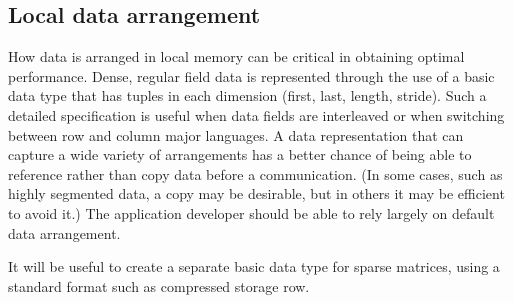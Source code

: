 \subsection{Local data arrangement}
How data is arranged in local memory can be critical in obtaining optimal 
performance.  Dense, regular field data is represented through the use 
of a basic data type that has tuples in each dimension (first, last, 
length, stride).  Such a detailed specification is useful when data fields are 
interleaved or when switching 
between row and column major languages.  A data representation that can 
capture a wide variety of arrangements has a better chance of being 
able to reference rather than copy data before a communication.  (In
some cases, such as highly segmented data, a copy may be desirable,
but in others it may be efficient to avoid it.)  The application developer
should be able to rely largely on default data arrangement.

It will be useful to create a separate basic data type for sparse 
matrices, using a standard format such as compressed storage row.










